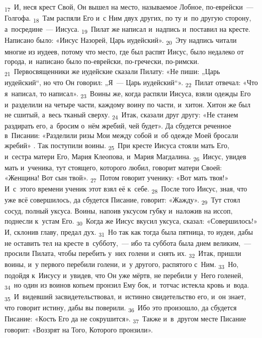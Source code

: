 \documentclass[a4paper,12pt]{article}
\begin{document}
\textsubscript{17}~И, неся крест Свой, Он вышел на место, называемое Лобное, по-еврейски~--- Голгофа.
\textsubscript{18}~Там распяли Его и~с Ним двух других, по ту и~по другую сторону, а~посредине~--- Иисуса.
\textsubscript{19}~Пилат же написал и~надпись и~поставил на кресте. Написано было: «Иисус Назорей, Царь иудейский».
\textsubscript{20}~Эту надпись читали многие из иудеев, потому что место, где был распят Иисус, было недалеко от города, и~написано было по-еврейски, по-гречески, по-римски.
\textsubscript{21}~Первосвященники же иудейские сказали Пилату: «Не пиши: „Царь иудейский“, но что Он говорил: „Я~--- Царь иудейский“».
\textsubscript{22}~Пилат отвечал: «Что я~написал, то написал».
\textsubscript{23}~Воины же, когда распяли Иисуса, взяли одежды Его и~разделили на четыре части, каждому воину по части, и~хитон. Хитон же был не сшитый, а~весь тканый сверху.
\textsubscript{24}~Итак, сказали друг другу: «Не станем раздирать его, а~бросим о~нём жребий, чей будет». Да сбудется реченное в~Писании: «Разделили ризы Мои между собой и~об одежде Моей бросали жребий» . Так поступили воины.
\textsubscript{25}~При кресте Иисуса стояли мать Его, и~сестра матери Его, Мария Клеопова, и~Мария Магдалина.
\textsubscript{26}~Иисус, увидев мать и~ученика, тут стоящего, которого любил, говорит матери Своей: «Женщина! Вот сын твой».
\textsubscript{27}~Потом говорит ученику: «Вот мать твоя!» И~с~этого времени ученик этот взял её к~себе.
\textsubscript{28}~После того Иисус, зная, что уже всё совершилось, да сбудется Писание, говорит: «Жажду».
\textsubscript{29}~Тут стоял сосуд, полный уксуса. Воины, напоив уксусом губку и~наложив на иссоп, поднесли к~устам Его.
\textsubscript{30}~Когда же Иисус вкусил уксуса, сказал: «Совершилось!» И, склонив главу, предал дух.
\textsubscript{31}~Но так как тогда была пятница, то иудеи, дабы не оставить тел на кресте в~субботу,~--- ибо та суббота была днем великим,~--- просили Пилата, чтобы перебить у~них голени и~снять их.
\textsubscript{32}~Итак, пришли воины, и~у первого перебили голени, и~у другого, распятого с~Ним.
\textsubscript{33}~Но, подойдя к~Иисусу и~увидев, что Он уже мёртв, не перебили у~Него голеней,
\textsubscript{34}~но один из воинов копьем пронзил Ему бок, и~тотчас истекла кровь и~вода.
\textsubscript{35}~И~видевший засвидетельствовал, и~истинно свидетельство его, и~он знает, что говорит истину, дабы вы поверили.
\textsubscript{36}~Ибо это произошло, да сбудется Писание: «Кость Его да не сокрушится».
\textsubscript{37}~Также и~в~другом месте Писание говорит: «Воззрят на Того, Которого пронзили». 
\end{document}

